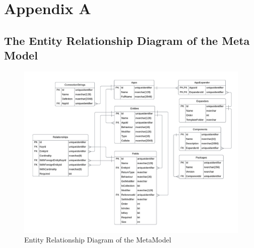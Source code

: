 \chapter{Appendix A} \label{AppendixA} 
\section{The Entity Relationship Diagram of the Meta Model} \label{appendix:erd} 
\begin{figure}[H]
    \centering
    \includegraphics[width=1\textwidth]{Figures/erd.pdf}
    \caption[ERD]{Entity Relationship Diagram of the MetaModel}
    \label{fig:erd}
\end{figure}
